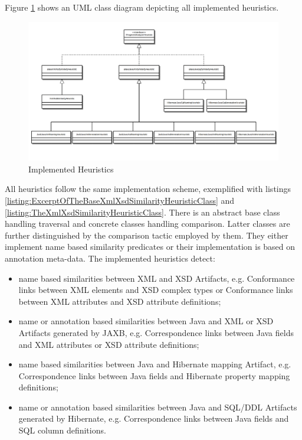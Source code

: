 Figure \ref{figure:ImplementedHeuristics} shows an \gls{UML} class diagram depicting all implemented heuristics.
\begin{figure}[h!]
\begin{center}
\includegraphics[width=\textwidth]{images/Heuristics.png}
\end{center}
\caption{Implemented Heuristics}
\label{figure:ImplementedHeuristics}
\end{figure}
All heuristics follow the same implementation scheme, exemplified with listings \ref{listing:ExcerptOfTheBaseXmlXsdSimilarityHeuristicClass} and \ref{listing:TheXmlXsdSimilarityHeuristicClass}.
There is an abstract base class handling traversal and concrete classes handling comparison.
Latter classes are further distinguished by the comparison tactic employed by them.
They either implement name based similarity predicates or their implementation is based on annotation meta-data.
The implemented heuristics detect:
\begin{itemize}
\item
name based similarities between \gls{XML} and \gls{XSD} \glspl{Artifact}, e.g. \gls{Conformance} links between \gls{XML} elements and \gls{XSD} complex types or \gls{Conformance} links between \gls{XML} attributes and \gls{XSD} attribute definitions;

\item
name or annotation based similarities between \gls{Java} and \gls{XML} or \gls{XSD} \glspl{Artifact} generated by \gls{JAXB}, e.g. \gls{Correspondence} links between \gls{Java} fields and \gls{XML} attributes or \gls{XSD} attribute definitions;

\item
name based similarities between \gls{Java} and \gls{Hibernate} mapping \gls{Artifact}, e.g. \gls{Correspondence} links between \gls{Java} fields and \gls{Hibernate} property mapping definitions;

\item
name or annotation based similarities between \gls{Java} and \gls{SQL/DDL} \glspl{Artifact} generated by \gls{Hibernate}, e.g. \gls{Correspondence} links between \gls{Java} fields and \gls{SQL} column definitions.
\end{itemize}